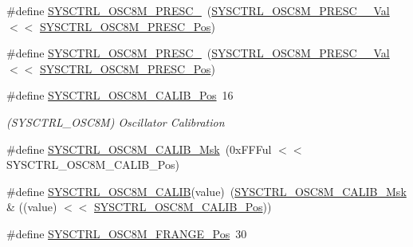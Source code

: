 \begin{DoxyCompactItemize}
\item 
\#define \mbox{\hyperlink{group___s_a_m_d21___s_y_s_c_t_r_l_gaa891d551778f957a46b91c914b056e43}{S\+Y\+S\+C\+T\+R\+L\+\_\+\+O\+S\+C8\+M\+\_\+\+P\+R\+E\+S\+C\+\_}}~(\mbox{\hyperlink{group___s_a_m_d21___s_y_s_c_t_r_l_ga0261bc5625974b1fe782548a9c01eb0b}{S\+Y\+S\+C\+T\+R\+L\+\_\+\+O\+S\+C8\+M\+\_\+\+P\+R\+E\+S\+C\+\_\+\_\+\+Val}}     $<$$<$ \mbox{\hyperlink{group___s_a_m_d21___s_y_s_c_t_r_l_gaaafcd541bd6a395901ec3232e063988d}{S\+Y\+S\+C\+T\+R\+L\+\_\+\+O\+S\+C8\+M\+\_\+\+P\+R\+E\+S\+C\+\_\+\+Pos}})
\item 
\#define \mbox{\hyperlink{group___s_a_m_d21___s_y_s_c_t_r_l_ga29e02efd25547c02e19de068fc325076}{S\+Y\+S\+C\+T\+R\+L\+\_\+\+O\+S\+C8\+M\+\_\+\+P\+R\+E\+S\+C\+\_}}~(\mbox{\hyperlink{group___s_a_m_d21___s_y_s_c_t_r_l_ga0c6779a9ce1a0206cd16fa70f867f058}{S\+Y\+S\+C\+T\+R\+L\+\_\+\+O\+S\+C8\+M\+\_\+\+P\+R\+E\+S\+C\+\_\+\_\+\+Val}}     $<$$<$ \mbox{\hyperlink{group___s_a_m_d21___s_y_s_c_t_r_l_gaaafcd541bd6a395901ec3232e063988d}{S\+Y\+S\+C\+T\+R\+L\+\_\+\+O\+S\+C8\+M\+\_\+\+P\+R\+E\+S\+C\+\_\+\+Pos}})
\item 
\#define \mbox{\hyperlink{group___s_a_m_d21___s_y_s_c_t_r_l_ga9258e5eb22022c6ea7f6049e74abb8b1}{S\+Y\+S\+C\+T\+R\+L\+\_\+\+O\+S\+C8\+M\+\_\+\+C\+A\+L\+I\+B\+\_\+\+Pos}}~16
\begin{DoxyCompactList}\small\item\em (S\+Y\+S\+C\+T\+R\+L\+\_\+\+O\+S\+C8M) Oscillator Calibration \end{DoxyCompactList}\item 
\#define \mbox{\hyperlink{group___s_a_m_d21___s_y_s_c_t_r_l_ga42fef20334c5f75bf09804cd0ed18c46}{S\+Y\+S\+C\+T\+R\+L\+\_\+\+O\+S\+C8\+M\+\_\+\+C\+A\+L\+I\+B\+\_\+\+Msk}}~(0x\+F\+F\+Ful $<$$<$ S\+Y\+S\+C\+T\+R\+L\+\_\+\+O\+S\+C8\+M\+\_\+\+C\+A\+L\+I\+B\+\_\+\+Pos)
\item 
\#define \mbox{\hyperlink{group___s_a_m_d21___s_y_s_c_t_r_l_ga6320fec0e37b849ddc1eb20eec4e841a}{S\+Y\+S\+C\+T\+R\+L\+\_\+\+O\+S\+C8\+M\+\_\+\+C\+A\+L\+IB}}(value)~(\mbox{\hyperlink{group___s_a_m_d21___s_y_s_c_t_r_l_ga42fef20334c5f75bf09804cd0ed18c46}{S\+Y\+S\+C\+T\+R\+L\+\_\+\+O\+S\+C8\+M\+\_\+\+C\+A\+L\+I\+B\+\_\+\+Msk}} \& ((value) $<$$<$ \mbox{\hyperlink{group___s_a_m_d21___s_y_s_c_t_r_l_ga9258e5eb22022c6ea7f6049e74abb8b1}{S\+Y\+S\+C\+T\+R\+L\+\_\+\+O\+S\+C8\+M\+\_\+\+C\+A\+L\+I\+B\+\_\+\+Pos}}))
\item 
\#define \mbox{\hyperlink{group___s_a_m_d21___s_y_s_c_t_r_l_ga29d2774a43cd9d3b53fde14cf70b27f6}{S\+Y\+S\+C\+T\+R\+L\+\_\+\+O\+S\+C8\+M\+\_\+\+F\+R\+A\+N\+G\+E\+\_\+\+Pos}}~30

\end{DoxyCompactItemize}
